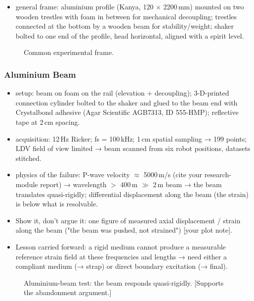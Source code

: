 \begin{itemize}
  \item [KEEP] general frame: aluminium profile (Kanya, 120 $\times$
    2200\,mm) mounted on two wooden trestles with foam in between for
    mechanical decoupling; trestles connected at the bottom by a wooden beam
    for stability/weight; shaker bolted to one end of the profile, head
    horizontal, aligned with a spirit level.
\end{itemize}

\begin{figure}[htb]
  \centering
  \caption{Common experimental frame.}
  \label{fig:methods:frame}
\end{figure}

\subsubsection{Aluminium Beam}
\begin{itemize}
  \item [KEEP] setup: beam on foam on the rail (elevation + decoupling);
    3-D-printed connection cylinder bolted to the shaker and glued to the
    beam end with Crystalbond adhesive (Agar Scientific AGB7313, ID
    555-HMP); reflective tape at 2\,cm spacing.
  \item [KEEP] acquisition: 12\,Hz Ricker; fs = 100\,kHz; 1\,cm spatial
    sampling → 199 points; LDV field of view limited → beam scanned from six
    robot positions, datasets stitched.
  \item [KEEP] physics of the failure: P-wave velocity $\approx$ 5000\,m/s
    (cite your research-module report) → wavelength $>$ 400\,m $\gg$ 2\,m
    beam → the beam translates quasi-rigidly; differential displacement
    along the beam (the strain) is below what is resolvable.
  \item Show it, don't argue it: one figure of measured axial displacement /
    strain along the beam ("the beam was pushed, not strained") [your plot
    note].
  \item Lesson carried forward: a rigid medium cannot produce a measurable
    reference strain field at these frequencies and lengths → need either a
    compliant medium (→ strap) or direct boundary excitation (→ final).
\end{itemize}

\begin{figure}[htb]
  \centering
  \caption{Aluminium-beam test: the beam responds quasi-rigidly. [Supports
    the abandonment argument.]}
  \label{fig:methods:alubeam}
\end{figure}

